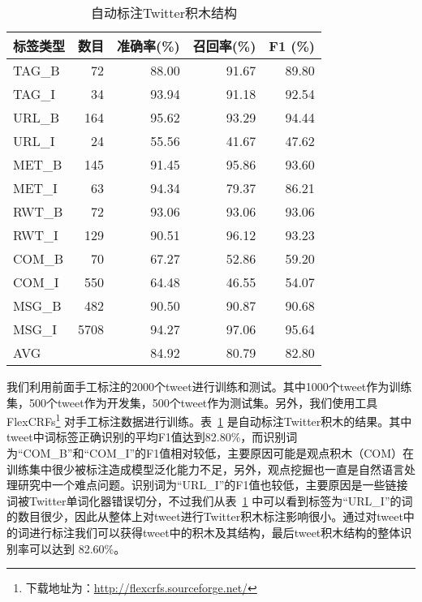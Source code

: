 \begin{table}[htp]
\centering
\caption{自动标注Twitter积木结构}
\label{TBB_Res}
\begin{tabular}[width=10pt ]{| l r| r r r |}
\hline
\textbf{标签类型} & \textbf{数目} & \textbf{准确率(\%)} & \textbf{召回率(\%)} & \textbf{F1 (\%)}\\
\hline
TAG\_B & 72 & 88.00& 91.67 & 89.80 \\
TAG\_I & 34 &93.94& 91.18 & 92.54\\
URL\_B & 164 & 95.62 & 93.29 & 94.44 \\
URL\_I & 24 & 55.56 & 41.67 & 47.62 \\
MET\_B & 145 & 91.45& 95.86 & 93.60 \\
MET\_I & 63 & 94.34& 79.37 & 86.21 \\
RWT\_B & 72 & 93.06& 93.06 & 93.06 \\
RWT\_I & 129 & 90.51& 96.12 & 93.23 \\
COM\_B & 70 & 67.27 & 52.86 & 59.20 \\
COM\_I & 550 & 64.48 & 46.55 & 54.07 \\
MSG\_B & 482 & 90.50 & 90.87 & 90.68 \\
MSG\_I & 5708 & 94.27& 97.06 & 95.64 \\
\hline
AVG & &84.92 & 80.79 & 82.80\\
\hline
\end{tabular}
\end{table}

我们利用前面手工标注的2000个tweet进行训练和测试。其中1000个tweet作为训练集，500个tweet作为开发集，500个tweet作为测试集。另外，我们使用工具FlexCRFs\footnote{下载地址为：\url{http://flexcrfs.sourceforge.net/}} 对手工标注数据进行训练。表~\ref{TBB_Res} 是自动标注Twitter积木的结果。其中tweet中词标签正确识别的平均F1值达到82.80\%，而识别词为“COM\_B”和“COM\_I”的F1值相对较低，主要原因可能是观点积木（COM）在训练集中很少被标注造成模型泛化能力不足，另外，观点挖掘也一直是自然语言处理研究中一个难点问题。识别词为“URL\_I”的F1值也较低，主要原因是一些链接词被Twitter单词化器错误切分，不过我们从表~\ref{TBB_Res} 中可以看到标签为“URL\_I”的词的数目很少，因此从整体上对tweet进行Twitter积木标注影响很小。通过对tweet中的词进行标注我们可以获得tweet中的积木及其结构，最后tweet积木结构的整体识别率可以达到 82.60\%。

